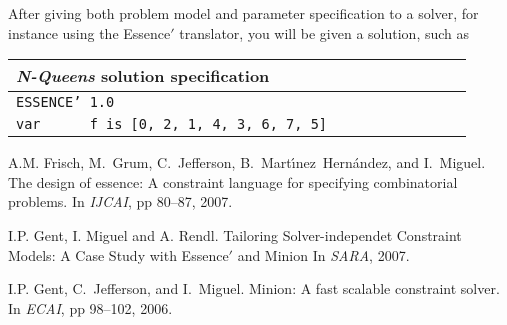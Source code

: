 \documentclass{article}
\begin{document}
After giving both problem model and parameter specification to a
solver, for instance using the {\sc Essence}$'$ translator, you 
will be given a solution, such as 


\begin{center}
\begin{tabular}{|l|}
\hline
{\bf {\em N-Queens} solution specification} \\
\hline 
\hline
{\tt ESSENCE' 1.0} \\
{\tt var \ \ \ \ \ f is [0, 2, 1, 4, 3, 6, 7, 5] \ \ \ \ \ \ \ \ \ \ \ \ \ \ \   }\\
\hline
\end{tabular}
\end{center}




\begin{thebibliography}{10}
\scriptsize
{}
A.M. Frisch, M.~Grum, C.~Jefferson, B.~Mart\'{\i}nez~Hern{\'a}ndez, and
  I.~Miguel.
\newblock The design of essence: A constraint language for specifying
  combinatorial problems.
\newblock In {\em IJCAI}, pp 80--87, 2007.


I.P. Gent, I. Miguel and A. Rendl.
\newblock Tailoring Solver-independet Constraint Models: A Case Study with Essence$'$ and Minion
\newblock In {\em SARA}, 2007.


I.P. Gent, C.~Jefferson, and I.~Miguel.
\newblock Minion: A fast scalable constraint solver.
\newblock In {\em ECAI}, pp 98--102, 2006.



\end{thebibliography}
\end{document}
